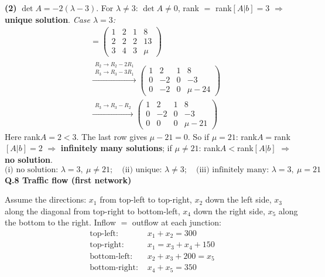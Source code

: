 \noindent\textbf{(2)}
$\det A=- 2 \left(\lambda - 3\right)$.
For $\lambda\ne 3$: $\det A\neq0$, rank $=$ rank$[A|b]=3$ $\Rightarrow$ \textbf{unique solution}.
\noindent\emph{Case $\lambda=3$:}
\begin{align*}
[A|b] &= \left(\begin{array}{ccc|c}1 & 2 & 1 & 8 \\ 2 & 2 & 2 & 13 \\ 3 & 4 & 3 & \mu\end{array}\right) \\
&\xrightarrow{\substack{R_2\to R_2-2R_1\\ R_3\to R_3-3R_1}} \left(\begin{array}{ccc|c}1 & 2 & 1 & 8 \\ 0 & -2 & 0 & -3 \\ 0 & -2 & 0 & \mu - 24\end{array}\right) \\
&\xrightarrow{\substack{R_3\to R_3-R_2}} \left(\begin{array}{ccc|c}1 & 2 & 1 & 8 \\ 0 & -2 & 0 & -3 \\ 0 & 0 & 0 & \mu - 21\end{array}\right)
\end{align*}
Here rank$A=2<3$. The last row gives $\mu - 21=0$. So if $\mu=21$: rank$A=$rank$[A|b]=2$ $\Rightarrow$ \textbf{infinitely many solutions}; if $\mu\neq 21$: rank$A<$rank$[A|b]$ $\Rightarrow$ \textbf{no solution}.
\[ \text{(i) no solution: }\lambda=3,\ \mu\neq 21;\quad \text{(ii) unique: }\lambda\neq 3;\quad \text{(iii) infinitely many: }\lambda=3,\ \mu=21 \]
\medskip\noindent\textbf{Q.8  Traffic flow (first network)}\par\smallskip
Assume the directions: $x_1$ from top-left to top-right, $x_2$ down the left side, $x_3$ along the diagonal from top-right to bottom-left, $x_4$ down the right side, $x_5$ along the bottom to the right. Inflow $=$ outflow at each junction:
\begin{align*}
\text{top-left: }& x_1+x_2=300 \\
\text{top-right: }& x_1=x_3+x_4+150 \\
\text{bottom-left: }& x_2+x_3+200=x_5 \\
\text{bottom-right: }& x_4+x_5=350
\end{align*}
